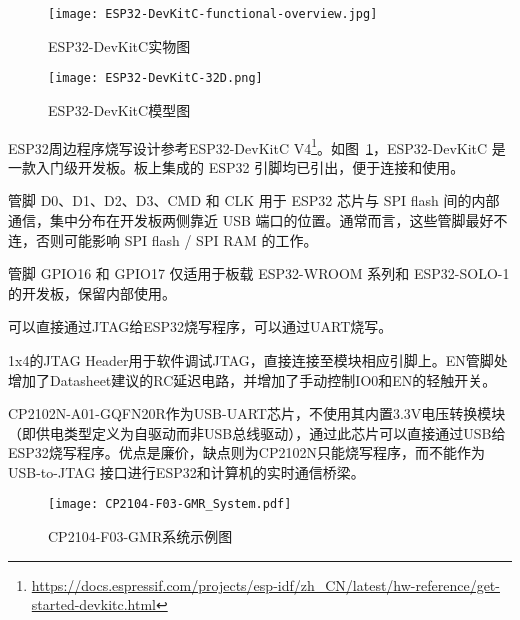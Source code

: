 
\begin{figure}[htbp]
    \centering
    \texttt{[image: ESP32-DevKitC-functional-overview.jpg]}
    \caption{ESP32-DevKitC实物图}
    \label{fig:ESP32-1}
\end{figure}


\begin{figure}[htbp]
    \centering
    \texttt{[image: ESP32-DevKitC-32D.png]}
    \caption{ESP32-DevKitC模型图}
    \label{fig:ESP32-2}
\end{figure}

ESP32周边程序烧写设计参考ESP32-DevKitC V4\footnote{\url{https://docs.espressif.com/projects/esp-idf/zh_CN/latest/hw-reference/get-started-devkitc.html}}。如图~\ref{fig:ESP32-1}，ESP32-DevKitC 是一款入门级开发板。板上集成的 ESP32 引脚均已引出，便于连接和使用。

管脚 D0、D1、D2、D3、CMD 和 CLK 用于 ESP32 芯片与 SPI flash 间的内部通信，集中分布在开发板两侧靠近 USB 端口的位置。通常而言，这些管脚最好不连，否则可能影响 SPI flash / SPI RAM 的工作。

管脚 GPIO16 和 GPIO17 仅适用于板载 ESP32-WROOM 系列和 ESP32-SOLO-1 的开发板，保留内部使用。

可以直接通过JTAG给ESP32烧写程序，可以通过UART烧写。

1x4的JTAG Header用于软件调试JTAG，直接连接至模块相应引脚上。EN管脚处增加了Datasheet建议的RC延迟电路，并增加了手动控制IO0和EN的轻触开关。

CP2102N-A01-GQFN20R作为USB-UART芯片，不使用其内置3.3V电压转换模块（即供电类型定义为自驱动而非USB总线驱动），通过此芯片可以直接通过USB给ESP32烧写程序。优点是廉价，缺点则为CP2102N只能烧写程序，而不能作为 USB-to-JTAG 接口进行ESP32和计算机的实时通信桥梁。

\begin{figure}[htbp]
    \centering
    \texttt{[image: CP2104-F03-GMR\_System.pdf]}
    \caption{CP2104-F03-GMR系统示例图}
    \label{fig:CP2104-F03-GMR}
\end{figure}

